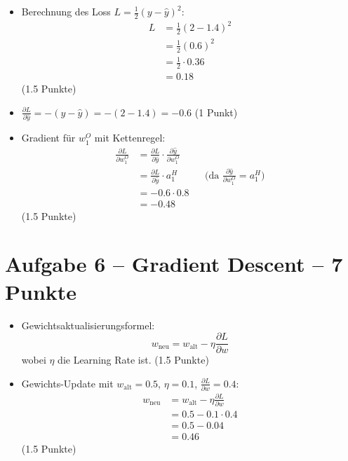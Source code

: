 \begin{itemize}
\item [d)] Berechnung des Loss $L = \frac{1}{2}(y - \hat{y})^2$:
\begin{align*}
L &= \frac{1}{2}(2 - 1.4)^2 \\
&= \frac{1}{2}(0.6)^2 \\
&= \frac{1}{2} \cdot 0.36 \\
&= 0.18
\end{align*}
(1.5 Punkte)
\end{itemize}

\begin{itemize}
\item [e)] $\frac{\partial L}{\partial \hat{y}} = -(y - \hat{y}) = -(2 - 1.4) = -0.6$ (1 Punkt)
\end{itemize}

\begin{itemize}
\item [f)] Gradient für $w_1^O$ mit Kettenregel:
\begin{align*}
\frac{\partial L}{\partial w_1^O} &= \frac{\partial L}{\partial \hat{y}} \cdot \frac{\partial \hat{y}}{\partial w_1^O} \\
&= \frac{\partial L}{\partial \hat{y}} \cdot a_1^H && \text{(da } \frac{\partial \hat{y}}{\partial w_1^O} = a_1^H\text{)} \\
&= -0.6 \cdot 0.8 \\
&= -0.48
\end{align*}
(1.5 Punkte)
\end{itemize}

\newpage

\section*{Aufgabe 6 -- Gradient Descent -- 7 Punkte}

\begin{itemize}
\item [a)] Gewichtsaktualisierungsformel:
\[
w_{\text{neu}} = w_{\text{alt}} - \eta \frac{\partial L}{\partial w}
\]
wobei $\eta$ die Learning Rate ist. (1.5 Punkte)
\end{itemize}

\begin{itemize}
\item [b)] Gewichts-Update mit $w_{\text{alt}} = 0.5$, $\eta = 0.1$, $\frac{\partial L}{\partial w} = 0.4$:
\begin{align*}
w_{\text{neu}} &= w_{\text{alt}} - \eta \frac{\partial L}{\partial w} \\
&= 0.5 - 0.1 \cdot 0.4 \\
&= 0.5 - 0.04 \\
&= 0.46
\end{align*}
(1.5 Punkte)
\end{itemize}

